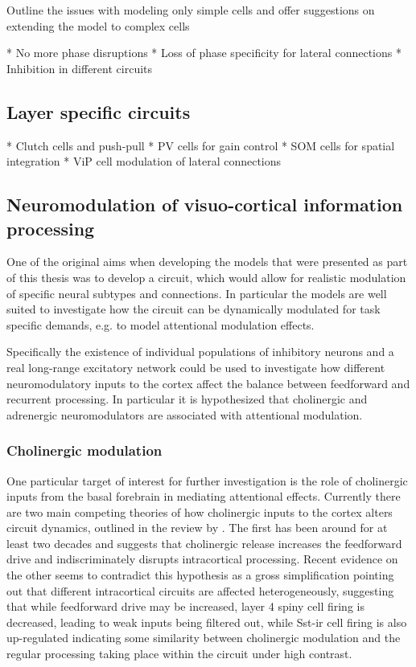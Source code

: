 Outline the issues with modeling only simple cells and offer
suggestions on extending the model to complex cells

* No more phase disruptions
* Loss of phase specificity for lateral connections
* Inhibition in different circuits

\subsection{Layer specific circuits}

* Clutch cells and push-pull
* PV cells for gain control
* SOM cells for spatial integration
* ViP cell modulation of lateral connections

\subsection{Neuromodulation of visuo-cortical information processing}

One of the original aims when developing the models that were
presented as part of this thesis was to develop a circuit, which would
allow for realistic modulation of specific neural subtypes and
connections. In particular the models are well suited to investigate
how the circuit can be dynamically modulated for task specific
demands, e.g. to model attentional modulation effects.

Specifically the existence of individual populations of inhibitory
neurons and a real long-range excitatory network could be used to
investigate how different neuromodulatory inputs to the cortex affect
the balance between feedforward and recurrent processing. In
particular it is hypothesized that cholinergic and adrenergic
neuromodulators are associated with attentional modulation.

\subsubsection{Cholinergic modulation}

One particular target of interest for further investigation is the
role of cholinergic inputs from the basal forebrain in mediating
attentional effects. Currently there are two main competing theories
of how cholinergic inputs to the cortex alters circuit dynamics,
outlined in the review by \cite{Thiele2013}. The first has been around
for at least two decades and suggests that cholinergic release
increases the feedforward drive and indiscriminately disrupts
intracortical processing. Recent evidence on the other seems to
contradict this hypothesis as a gross simplification pointing out that
different intracortical circuits are affected heterogeneously,
suggesting that while feedforward drive may be increased, layer 4
spiny cell firing is decreased, leading to weak inputs being filtered
out, while Sst-ir cell firing is also up-regulated indicating some
similarity between cholinergic modulation and the regular processing
taking place within the circuit under high contrast.


